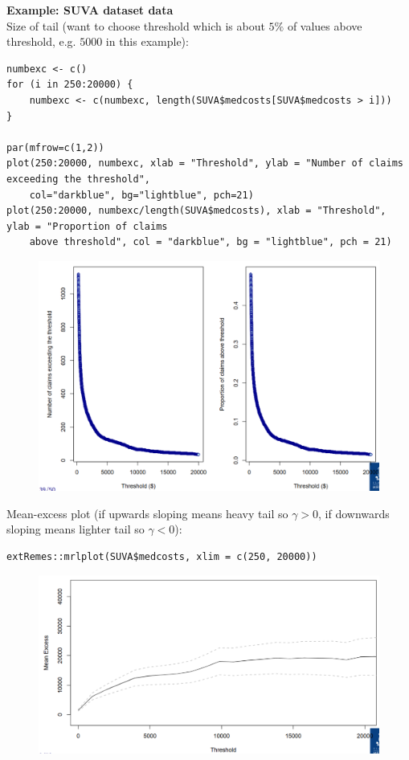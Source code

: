 \documentclass[11pt]{article}
\newcommand{\noi}{\noindent}
\begin{document}
\noi \textbf{Example: SUVA dataset data} \\
\noi Size of tail (want to choose threshold which is about $5\%$ of values above threshold, e.g. $5000$ in this example):
\begin{lstlisting}
numbexc <- c()
for (i in 250:20000) {
    numbexc <- c(numbexc, length(SUVA$medcosts[SUVA$medcosts > i]))
}

par(mfrow=c(1,2))
plot(250:20000, numbexc, xlab = "Threshold", ylab = "Number of claims exceeding the threshold",
    col="darkblue", bg="lightblue", pch=21)
plot(250:20000, numbexc/length(SUVA$medcosts), xlab = "Threshold", ylab = "Proportion of claims
    above threshold", col = "darkblue", bg = "lightblue", pch = 21)
\end{lstlisting}
\begin{figure}[H]
    \centering
    \includegraphics[width=0.7\linewidth]{GPD - example - size of tail.png}
\end{figure}

\noi Mean-excess plot (if upwards sloping means heavy tail so $\gamma > 0$, if downwards sloping means lighter tail so $\gamma < 0$):
\begin{lstlisting}
extRemes::mrlplot(SUVA$medcosts, xlim = c(250, 20000))
\end{lstlisting}
\begin{figure}[H]
    \centering
    \includegraphics[width=0.7\linewidth]{GPD - example - mean excess plot.png}
\end{figure}
\end{document}
